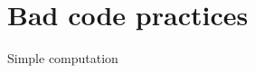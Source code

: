 \section[Bad practices]{Bad code practices}

\begin{frame}[fragile,t]{Simple computation}

    \begin{center}\begin{minipage}{0.7\linewidth}
    \inputminted[xleftmargin=3em, numbersep=8pt]{python}{code/bad_practices/example_1.py}
    \end{minipage}\end{center}

\end{frame}




